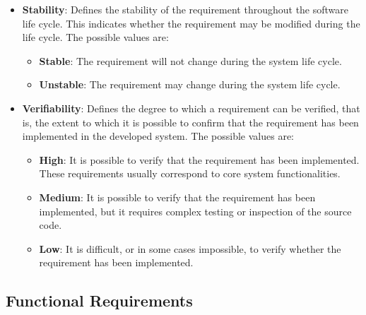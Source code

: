 \begin{itemize}
    \item \textbf{Stability}: Defines the stability of the requirement throughout the software life cycle. This indicates whether the requirement may be modified during the life cycle. The possible values are:
    \begin{itemize}
        \item \textbf{Stable}: The requirement will not change during the system life cycle.
        \item \textbf{Unstable}: The requirement may change during the system life cycle.
    \end{itemize}

    \item \textbf{Verifiability}: Defines the degree to which a requirement can be verified, that is, the extent to which it is possible to confirm that the requirement has been implemented in the developed system. The possible values are:
    \begin{itemize}
        \item \textbf{High}: It is possible to verify that the requirement has been implemented. These requirements usually correspond to core system functionalities.
        \item \textbf{Medium}: It is possible to verify that the requirement has been implemented, but it requires complex testing or inspection of the source code.
        \item \textbf{Low}: It is difficult, or in some cases impossible, to verify whether the requirement has been implemented.
    \end{itemize}
\end{itemize}

\subsection{Functional Requirements}

